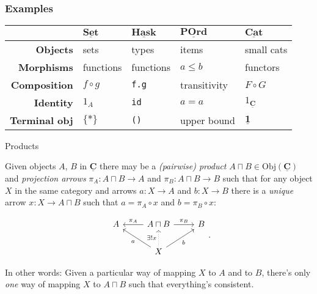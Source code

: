 \documentclass[10pt]{beamer}
\newcommand{\Cat}[1]{\ensuremath{\underline{\mathbf{#1}}}}
\newcommand{\Obj}[1]{\ensuremath{\mathrm{Obj}(\Cat{#1})}}
\theoremstyle{definition}
\theoremstyle{remark}
\numberwithin{equation}{section}
\begin{document}
\begin{frame}[fragile]
  \frametitle{Examples}

  \begin{center}
    \begin{tabular}{r l l l l}\toprule
    & $\Cat{Set}$ & $\Cat{Hask}$ & $\Cat{POrd}$ & $\Cat{Cat}$ \\\midrule
    \textbf{Objects} & sets & types & items & small cats \\
    \textbf{Morphisms} & functions & functions & $a \leq b$ & functors \\
    \textbf{Composition} & $f \circ g$ & \lstinline!f.g! & transitivity & $F \circ G$ \\
    \textbf{Identity} & $1_A$ & {\lstinline!id!} & $a = a$ & $1_{\Cat{C}}$ \\
      \textbf{Terminal obj\rlap{.}} & $\{*\}$ & \lstinline!()! & upper bound & $\Cat{1}$ \\\bottomrule
  \end{tabular}
  \end{center}
  
\end{frame}

\begin{frame}[fragile]{Products}

  Given objects $A$, $B$ in $\Cat{C}$ there may be a \emph{(pairwise) product}
  $A\sqcap B \in \Obj{C}$ and \emph{projection arrows} $\pi_A \colon A \sqcap B \rightarrow A$ and
  $\pi_B \colon A \sqcap B \rightarrow B$ such that for any object $X$ in the same category and arrows
  $a \colon X \rightarrow  A$ and $b \colon X \rightarrow B$
  there is a \emph{unique} arrow $x : X \rightarrow A \sqcap B$ such that $a = \pi_A \circ x$ and $b = \pi_B \circ x$:

  \[
  \begin{tikzcd}
    A & A\sqcap B \arrow[swap]{l}{\pi_{A}} \arrow{r}{\pi_{B}} & B \\
    & X \arrow[dotted]{u}{\exists! x} \arrow{ul}{a} \arrow[swap]{ur}{b} & 
  \end{tikzcd}\rlap{.}
  \]

  In other words: Given a particular way of mapping $X$ to $A$ and to $B$, there's only \emph{one} way of mapping $X$ to $A \sqcap B$ such that everything's consistent.

\end{frame}
\end{document}
